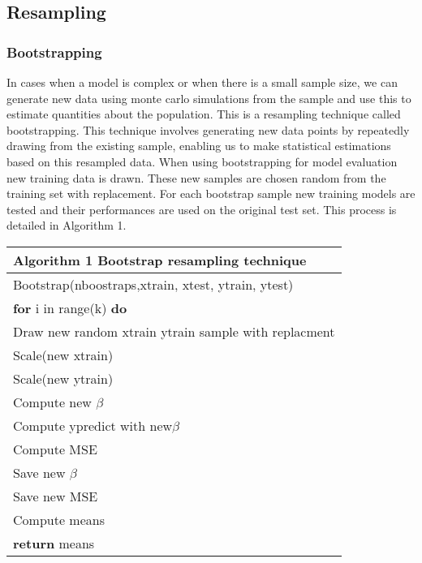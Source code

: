 \documentclass[a4paper,12pt]{article}
\begin{document}
\subsection{Resampling}
\subsubsection{Bootstrapping}
\noindent
In cases when a model is complex or when there is a small sample size, we can generate new data using monte carlo simulations from the sample and use this to estimate quantities about the population. This is a resampling technique called bootstrapping. This technique involves generating new data points by repeatedly drawing from the existing sample, enabling us to make statistical estimations based on this resampled data. When using bootstrapping for model evaluation new training data is drawn. These new samples are chosen random from the training set with replacement. For each bootstrap sample new training models are tested and their performances are used on the original test set. This process is detailed in Algorithm 1.

\begin{table}[!h]
\begin{tabular}{l} 
\hline
\textbf{Algorithm 1}  Bootstrap resampling technique\\ \hline 
Bootstrap(nboostraps,xtrain, xtest, ytrain, ytest)\\
\quad \textbf{for} i in range(k) \textbf{do}\\
\quad\quad Draw new random xtrain ytrain sample with replacment\\
\quad\quad Scale(new xtrain)\\
\quad\quad Scale(new ytrain)\\
\quad\quad Compute new $\beta$\\
\quad\quad Compute ypredict with new$\beta$ \\
\quad\quad Compute MSE \\
\quad\quad Save new $\beta$\\
\quad\quad Save new MSE\\
\quad Compute means\\
\quad \textbf{return} means
 \\ [1ex] 
\hline
\end{tabular}
\end{table}
\end{document}

